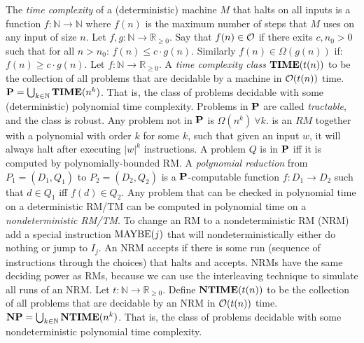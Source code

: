  The \textit{time complexity} of a (deterministic) machine $M$ that halts on all inputs is a function $f : \mathbb{N} \to \mathbb{N}$ where $f(n)$ is the maximum number of steps that $M$ uses on any input of size $n$.
 Let $f,g : \mathbb{N} \to \mathbb{R}_{\ge 0}$. Say that $f(n) \in \operatorname{\mathcal{O}}$ if there exits $c, n_0 > 0$ such that for all $n > n_0$: 
$f(n) \le c \cdot g(n)$.
Similarly $f(n) \in \Omega(g(n))$ if: 
$f(n) \ge c \cdot g(n)$.
 Let $f : \mathbb{N} \to \mathbb{R}_{\ge 0}$. A \textit{time complexity class} $\operatorname{\mathbf{TIME}}(t(n))$ to be the collection of all problems that are decidable by a machine in $\operatorname{\mathcal{O}}(t(n))$ time.
 $\operatorname{\mathbf{P}} = \bigcup_{k \in \mathbb{N}} \operatorname{\mathbf{TIME}}(n^k)$. That is, the class of problems decidable with some (deterministic) polynomial time complexity. Problems in $\operatorname{\mathbf{P}}$ are called \textit{tractable}, and the class is robust.
Any problem not in $\operatorname{\mathbf{P}}$ is $\Omega(n^k)\ \forall k$.
 is an $RM$ together with a polynomial with order $k$ for some $k$, such that given an input $w$, it will always halt after executing $|w|^k$ instructions. A problem $Q$ is in $\operatorname{\mathbf{P}}$ iff it is computed by polynomially-bounded RM.
 A \textit{polynomial reduction} from $P_1 = (D_1, Q_1)$ to $P_2 = (D_2, Q_2)$ is a $\operatorname{\mathbf{P}}$-computable function $f: D_1 \to D_2$ such that $d \in Q_1$ iff $f(d) \in Q_2$.
 Any problem that can be checked in polynomial time on a deterministic RM/TM can be computed in polynomial time on a \emph{nondeterministic RM/TM}.
 To change an RM to a nondeterministic RM (NRM) add a special instruction $\operatorname{MAYBE}(j)$ that will nondeterministically either do nothing or jump to $I_j$.
 An NRM accepts if there is some run (sequence of instructions through the choices) that halts and accepts.
 NRMs have the same deciding power as RMs, because we can use the interleaving technique to simulate all runs of an NRM.
\wde{$\NTIME$} Let $t : \mathbb{N} \to \mathbb{R}_{\ge 0}$. Define $\operatorname{\mathbf{NTIME}}(t(n))$ to be the collection of all problems that are decidable by an NRM in $\operatorname{\mathcal{O}}(t(n))$ time.
\wde{$\NP$}  $\operatorname{\mathbf{NP}} = \bigcup_{k \in \mathbb{N}} \operatorname{\mathbf{NTIME}}(n^k)$. That is, the class of problems decidable with some nondeterministic polynomial time complexity.